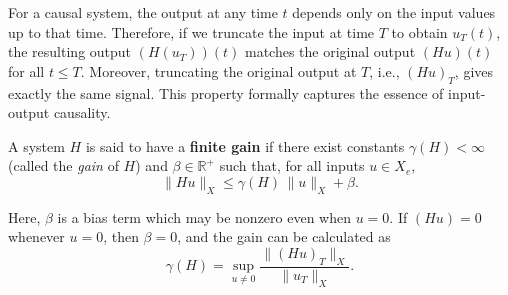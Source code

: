 \begin{example}
\begin{center}
\end{center}
\end{example}

\begin{remark}
For a causal system, the output at any time $t$ depends only on the input values up to that time. Therefore, if we truncate the input at time $T$ to obtain $u_T(t)$, the resulting output $(H(u_T))(t)$ matches the original output $(Hu)(t)$ for all $t \le T$. Moreover, truncating the original output at $T$, i.e., $(Hu)_T$, gives exactly the same signal. This property formally captures the essence of input-output causality.
\end{remark}

\begin{definition}
A system $H$ is said to have a \textbf{finite gain} if there exist constants 
\(\gamma(H) < \infty\) (called the \emph{gain} of $H$) and \(\beta \in \mathbb{R}^+\) such that, for all inputs \(u \in X_e\),
\begin{equation}
\| Hu \|_X \le \gamma(H) \, \| u \|_X + \beta.
\end{equation}

Here, \(\beta\) is a bias term which may be nonzero even when \(u = 0\).  
If \((Hu) = 0\) whenever \(u = 0\), then \(\beta = 0\), and the gain can be calculated as
\begin{equation}
\gamma(H) = \sup_{u \neq 0} \frac{\| (Hu)_T \|_X}{\| u_T \|_X}.
\end{equation}
\end{definition}

